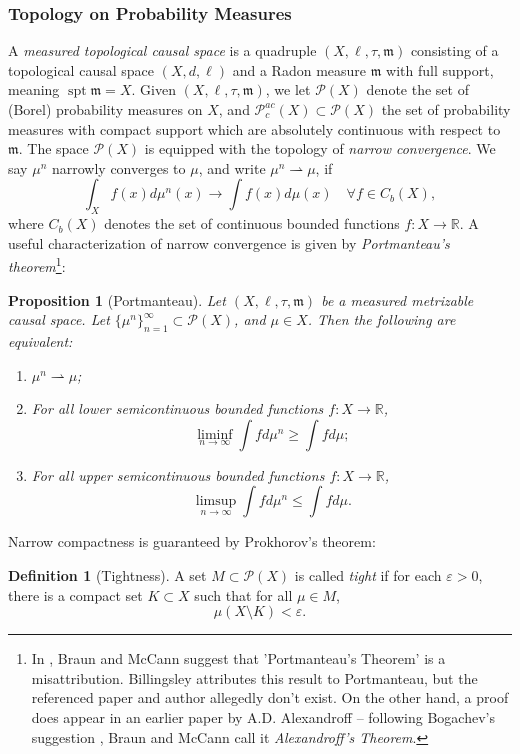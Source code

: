 \documentclass{article}
\renewcommand{\epsilon}{\varepsilon}
\newcommand{\R}{\mathbb{R}}
\newcommand{\m}{\mathfrak{m}}
\newcommand{\narrowto}{\rightharpoonup}
\DeclareMathOperator{\spt}{spt}
\newcommand{\Pcal}{\mathcal{P}}
\newtheorem{prop}[theorem]{Proposition}
\theoremstyle{definition}
\newtheorem{defn}{Definition}[section]
\begin{document}
\subsubsection{Topology on Probability Measures}
A {\it measured topological causal space} is a quadruple $(X,\ell,\tau, \m)$ consisting of a topological causal space $(X,d,\ell)$ and a Radon measure $\m$ with full support, meaning $\spt\m=X$. Given $(X,\ell, \tau, \m)$, we let $\Pcal(X)$ denote the set of (Borel) probability measures on $X$, and $\Pcal_c^{ac}(X)\subset \Pcal(X)$ the set of probability measures with compact support which are absolutely continuous with respect to $\m$. The space $\Pcal(X)$ is equipped with the topology of {\it narrow convergence}. We say $\mu^n$ narrowly converges to $\mu$, and write $\mu^n\narrowto\mu$, if 
\[\int_X f(x)d\mu^n(x)\to \int f(x)d\mu(x) \quad \forall f\in C_b(X),\]
where $C_b(X)$ denotes the set of continuous bounded functions $f:X\to \R$. A useful characterization of narrow convergence is given by {\it Portmanteau's theorem}\footnote{In \cite[pp. 26-27]{BraunMcCann}, Braun and McCann suggest that 'Portmanteau's Theorem' is a misattribution. Billingsley attributes this result to Portmanteau, but the referenced paper and author allegedly don't exist. On the other hand, a proof does appear in an earlier paper by A.D. Alexandroff \cite[\S 16]{Alexandroff}-- following Bogachev's suggestion \cite[pp 454]{Bogachev}, Braun and McCann call it {\it Alexandroff's Theorem}.}: 
\begin{prop}[Portmanteau]
Let $(X,\ell, \tau, \m)$ be a measured metrizable causal space. Let $\{\mu^n\}_{n=1}^\infty\subset \Pcal(X)$, and $\mu\in X$. Then the following are equivalent: 
\begin{enumerate}
\item $\mu^n\narrowto \mu$;
\item For all  lower semicontinuous bounded functions $f:X\to \R$,  \[\liminf_{n\to\infty}\int fd\mu^n \geq \int fd\mu; \]
\item For all upper semicontinuous bounded functions $f:X\to \R$, 
\[\limsup_{n\to\infty}\int fd\mu^n\leq \int f d\mu.\]
\end{enumerate}
\end{prop}

Narrow compactness is guaranteed by Prokhorov's theorem: 
\begin{defn}[Tightness]
 A set $M\subset \Pcal(X)$ is called {\it tight} if for each $\epsilon>0$, there is a compact set $K\subset X$ such that for all $\mu\in M$, 
\[\mu(X\setminus K)<\epsilon.\]
\end{defn}
\end{document}
